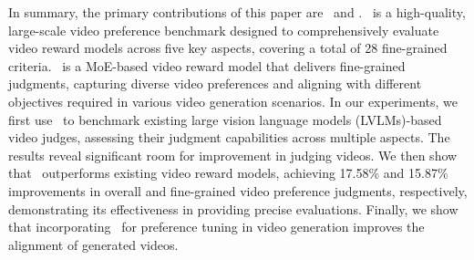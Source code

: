 In summary, the primary contributions of this paper are \datasetname\ and \algname. \datasetname\ is a high-quality, large-scale video preference benchmark designed to comprehensively evaluate video reward models across five key aspects, covering a total of 28 fine-grained criteria. \algname\ is a MoE-based video reward model that delivers fine-grained judgments, capturing diverse video preferences and aligning with different objectives required in various video generation scenarios. In our experiments, we first use \datasetname\ to benchmark existing large vision language models (LVLMs)-based video judges, assessing their judgment capabilities across multiple aspects. The results reveal significant room for improvement in judging videos. We then show that \algname\ outperforms existing video reward models, achieving 17.58\% and 15.87\% improvements in overall and fine-grained video preference judgments, respectively, demonstrating its effectiveness in providing precise evaluations. Finally, we show that incorporating \algname\ for preference tuning in video generation improves the alignment of generated videos.
















